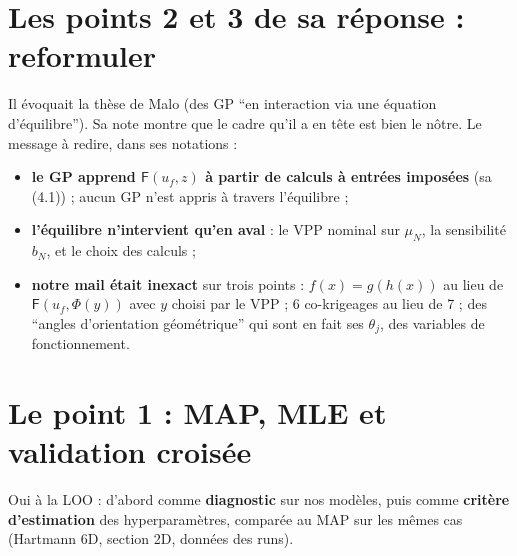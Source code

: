 \documentclass[11pt,a4paper]{article}
\newcommand{\F}{\mathsf{F}}
\begin{document}
\section{Les points 2 et 3 de sa réponse : reformuler}
Il évoquait la thèse de Malo (des GP \enquote{en interaction via une équation d'équilibre}). Sa note montre que
le cadre qu'il a en tête est bien le nôtre. Le message à redire, dans ses notations :
\begin{itemize}
  \item \textbf{le GP apprend $\F(u_f,z)$ à partir de calculs à entrées imposées} (sa (4.1)) ; aucun GP n'est
        appris à travers l'équilibre ;
  \item \textbf{l'équilibre n'intervient qu'en aval} : le VPP nominal sur $\mu_N$, la sensibilité $b_N$, et le
        choix des calculs ;
  \item \textbf{notre mail était inexact} sur trois points : $f(x)=g(h(x))$ au lieu de $\F(u_f,\Phi(y))$ avec
        $y$ choisi par le VPP ; 6 co-krigeages au lieu de 7 ; des \enquote{angles d'orientation
        géométrique} qui sont en fait ses $\theta_j$, des variables de fonctionnement.
\end{itemize}

\section{Le point 1 : MAP, MLE et validation croisée}
\begin{adire}
Oui à la LOO : d'abord comme \textbf{diagnostic} sur nos modèles, puis comme \textbf{critère d'estimation}
des hyperparamètres, comparée au MAP sur les mêmes cas (Hartmann 6D, section 2D, données des runs).
\end{adire}
\end{document}
